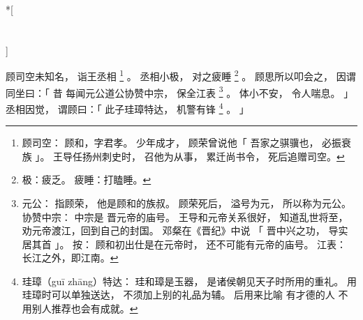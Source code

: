 
\switchcolumn[0]*[\section{}]

顾司空未知名，
诣王丞相%
\footnote{%
    顾司空：
        顾和，字君孝。
        少年成才，
        顾荣曾说他「
            吾家之骐骥也，
            必振衰族
        」。
        王导任扬州刺史时，
        召他为从事，
        累迁尚书令，
        死后追赠司空。
}%
。
丞相小极，
对之疲睡%
\footnote{%
    极：疲乏。
    疲睡：打瞌睡。
}%
。
顾思所以叩会之，
因谓同坐曰：「
    昔
    每闻元公道公协赞中宗，
    保全江表%
    \footnote{%
        元公：
            指顾荣，
            他是顾和的族叔。
            顾荣死后，
            溢号为元，
            所以称为元公。
        协赞中宗：
            中宗是
            晋元帝的庙号。
            王导和元帝关系很好，
            知道乱世将至，
            劝元帝渡江，回到自己的封国。
            邓粲在《晋纪》中说
            「
                晋中兴之功，
                导实居其首
            」。
            按：
            顾和初出仕是在元帝时，
            还不可能有元帝的庙号。
        江表：
            长江之外，即江南。
    }%
    。
    体小不安，
    令人喘息。
」
丞相因觉，
谓顾曰：「
    此子珪璋特达，
    机警有锋%
    \footnote{%
        珪璋（guī zhāng）特达：
            珪和璋是玉器，
            是诸侯朝见天子时所用的重礼。
            用珪璋时可以单独送达，
            不须加上别的礼品为辅。
            后用来比喻
            有才德的人
            不用别人推荐也会有成就。
    }%
    。
」

\switchcolumn


